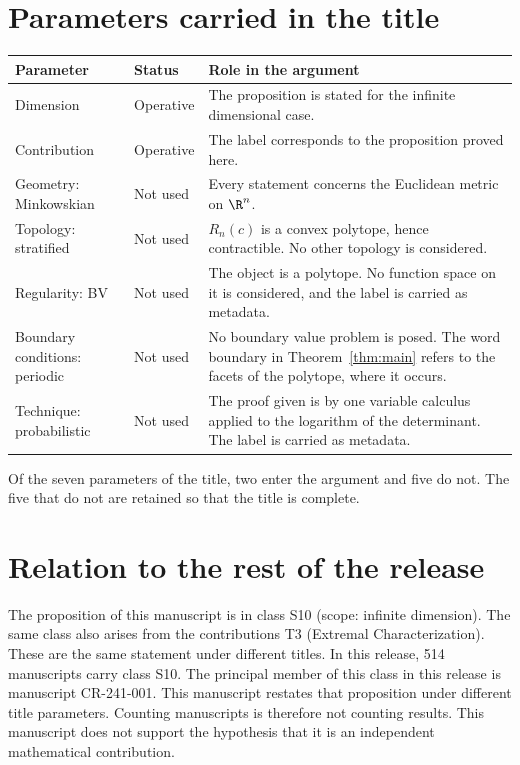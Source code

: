 \documentclass[11pt]{article}
\begin{document}
\section{Parameters carried in the title}\label{sec:params}
\begin{center}
\small
\begin{tabular}{p{}p{}p{}}
\toprule
Parameter & Status & Role in the argument \\
\midrule
Dimension & Operative & The proposition is stated for the infinite dimensional case. \\
Contribution & Operative & The label corresponds to the proposition proved here. \\
Geometry: Minkowskian & Not used & Every statement concerns the Euclidean metric on $\R^n$. \\
Topology: stratified & Not used & $R_n(c)$ is a convex polytope, hence contractible. No other topology is considered. \\
Regularity: BV & Not used & The object is a polytope. No function space on it is considered, and the label is carried as metadata. \\
Boundary conditions: periodic & Not used & No boundary value problem is posed. The word boundary in Theorem~\ref{thm:main} refers to the facets of the polytope, where it occurs. \\
Technique: probabilistic & Not used & The proof given is by one variable calculus applied to the logarithm of the determinant. The label is carried as metadata. \\
\bottomrule
\end{tabular}
\end{center}
Of the seven parameters of the title, two enter the argument and five do not. The five that do not are retained so that the title is complete.

\section{Relation to the rest of the release}
The proposition of this manuscript is in class S10 (scope: infinite dimension). The same class also arises from the contributions T3 (Extremal Characterization). These are the same statement under different titles.
In this release, 514 manuscripts carry class S10. The principal member of this class in this release is manuscript CR-241-001. This manuscript restates that proposition under different title parameters.
Counting manuscripts is therefore not counting results. This manuscript does not support the hypothesis that it is an independent mathematical contribution.
\end{document}
